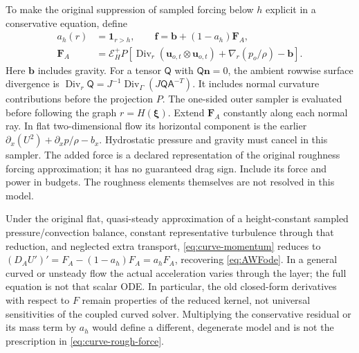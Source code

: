 \documentclass[11pt,a4paper]{article}
\numberwithin{equation}{section}
\begin{document}
To make the original suppression of sampled forcing below $h$ explicit
in a conservative equation, define
\begin{equation}
 \begin{aligned}
 a_h(r)&=\bm 1_{r>h},\qquad
 \bm f=\bm b+(1-a_h)\bm F_A,\\
 \bm F_A&=\mathcal E_H^+P\left[
   \operatorname{Div}_r(\bm u_{o,t}\otimes\bm u_{o,t})
   +\nabla_r(p_o/\rho)-\bm b\right].
 \end{aligned}
 \label{eq:curve-rough-force}
\end{equation}
Here $\bm b$ includes gravity. For a tensor $\mathsf Q$ with
$\mathsf Q\bm n=0$, the ambient rowwise surface divergence is
$\operatorname{Div}_r\mathsf Q
=J^{-1}\operatorname{Div}_\Gamma(J\mathsf Q\mathsf A^{-T})$.
It includes normal curvature contributions before the projection $P$.
The one-sided
outer sampler is evaluated before following the graph $r=H(\bm\xi)$.
Extend $\bm F_A$ constantly along each normal ray. In flat two-dimensional
flow its horizontal component is the earlier
$\partial_x(U^2)+\partial_xp/\rho-b_x$. Hydrostatic pressure and
gravity must cancel in this sampler. The added force is a declared
representation of the original roughness forcing approximation; it
has no guaranteed drag sign. Include its force and power in budgets.
The roughness elements themselves are not resolved in this model.

Under the original flat, quasi-steady approximation of a height-constant
sampled pressure/convection balance, constant representative turbulence
through that reduction, and neglected extra transport,
\cref{eq:curve-momentum} reduces to
$(D_AU')'=F_A-(1-a_h)F_A=a_hF_A$, recovering \cref{eq:AWFode}.
In a general curved or unsteady flow the actual acceleration varies
through the layer; the full equation is not that scalar ODE. In
particular, the old closed-form derivatives with respect to $F$ remain
properties of the reduced kernel, not universal sensitivities of the
coupled curved solver. Multiplying the conservative residual or its
mass term by $a_h$ would define a different, degenerate model and is
not the prescription in \cref{eq:curve-rough-force}.
\end{document}
